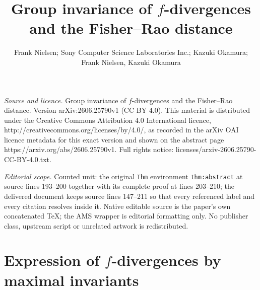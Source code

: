 \documentclass[10pt,a4paper]{amsart}
\begin{document}
\title[Group invariance of f-divergences and the Fisher--Rao distan]{Group invariance of $f$-divergences and the Fisher--Rao distance}
\author{Frank Nielsen; Sony Computer Science Laboratories Inc.; Kazuki Okamura; Frank Nielsen, Kazuki Okamura}
\date{}
\maketitle
\noindent\emph{Source and licence.} Group invariance of $f$-divergences and the Fisher--Rao distance. Version arXiv:2606.25790v1 (CC BY 4.0). This material is distributed under the Creative Commons Attribution 4.0 International licence, http://creativecommons.org/licenses/by/4.0/, as recorded in the arXiv OAI licence metadata for this exact version and shown on the abstract page https://arxiv.org/abs/2606.25790v1. Full rights notice: licenses/arxiv-2606.25790-CC-BY-4.0.txt.\par\smallskip
\noindent\textit{Editorial scope.} Counted unit: the original \texttt{Thm} environment \texttt{thm:abstract} at source lines 193--200 together with its complete proof at lines 203--210; the delivered document keeps source lines 147--211 so that every referenced label and every citation resolves inside it. Native editable source is the paper's own concatenated TeX; the AMS wrapper is editorial formatting only. No publisher class, upstream script or unrelated artwork is redistributed.
\section{Expression of \texorpdfstring{$f$}{f}-divergences by maximal invariants}
\end{document}
